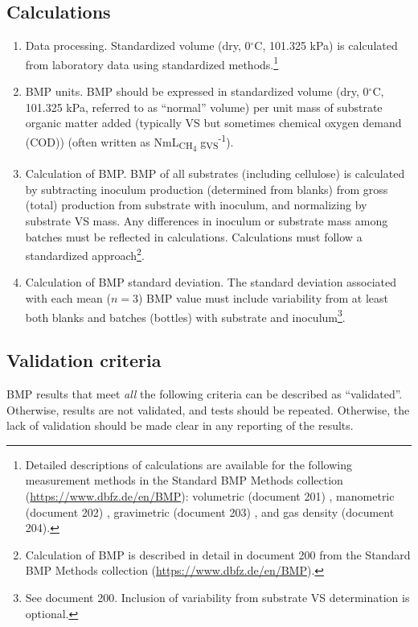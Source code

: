 \documentclass[]{article}
\begin{document}
\subsection{Calculations}
\label{sec:calculations}
\begin{enumerate}
  \item Data processing.
    Standardized  volume (dry, 0$^\circ$C, 101.325 kPa) is calculated from laboratory data using standardized methods.\footnote{
      Detailed descriptions of calculations are available for the following measurement methods in the Standard BMP Methods collection (\url{https://www.dbfz.de/en/BMP}): volumetric (document 201) \citep{BMPdoc201vol}, manometric (document 202) \citep{BMPdoc202man}, gravimetric (document 203) \citep{BMPdoc203grav}, and gas density (document 204).
    }
  \item BMP units.
	  BMP should be expressed in standardized  volume (dry, 0$^\circ$C, 101.325 kPa, referred to as ``normal'' volume) per unit mass of substrate organic matter added (typically VS but sometimes chemical oxygen demand (COD)) (often written as NmL\textsubscript{CH\textsubscript{4}} g\textsubscript{VS}\textsuperscript{-1}). 
  \item Calculation of BMP.
    BMP of all substrates (including cellulose) is calculated by subtracting inoculum  production (determined from blanks) from gross (total)  production from substrate with inoculum, and normalizing by substrate VS mass.
    Any differences in inoculum or substrate mass among batches must be reflected in calculations.
    Calculations must follow a standardized approach\footnote{
      Calculation of BMP is described in detail in document 200 from the Standard BMP Methods collection (\url{https://www.dbfz.de/en/BMP}).
    }.
  \item Calculation of BMP standard deviation.
    The standard deviation associated with each mean ($n = 3$) BMP value must include variability from at least both blanks and batches (bottles) with substrate and inoculum\footnote{
      See document 200. 
      Inclusion of variability from substrate VS determination is optional.
    }.
\end{enumerate}

\subsection{Validation criteria}
\label{sec:crit}
BMP results that meet \textit{all} the following criteria can be described as ``validated''.
Otherwise, results are not validated, and tests should be repeated. Otherwise, the lack of validation should be made clear in any reporting of the results.
\end{document}
